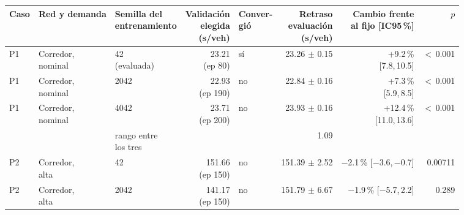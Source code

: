 \begin{table}[H]
\centering
\scriptsize
\setlength{\tabcolsep}{3pt}
\begin{tabular}{lllrlrrr}
\toprule
Caso & Red y demanda & \makecell{Semilla del\\entrenamiento} & \makecell{Validación\\elegida\\(s/veh)} & \makecell{Conver-\\gió} & \makecell{Retraso\\evaluación\\(s/veh)} & \makecell{Cambio frente\\al fijo [IC95\,\%]} & $p$ \\
\midrule
P1 & \makecell[l]{Corredor,\\{}nominal} & \makecell[l]{42\\{}(evaluada)} & \makecell[r]{23.21\\{}(ep 80)} & sí & \makecell[r]{23.26\\{}$\pm$ 0.15} & \makecell[r]{+9.2\,\%\\{}[7.8,\,10.5]} & $<$\,0.001 \\
P1 & \makecell[l]{Corredor,\\{}nominal} & 2042 & \makecell[r]{22.93\\{}(ep 190)} & no & \makecell[r]{22.84\\{}$\pm$ 0.16} & \makecell[r]{+7.3\,\%\\{}[5.9,\,8.5]} & $<$\,0.001 \\
P1 & \makecell[l]{Corredor,\\{}nominal} & 4042 & \makecell[r]{23.71\\{}(ep 200)} & no & \makecell[r]{23.93\\{}$\pm$ 0.16} & \makecell[r]{+12.4\,\%\\{}[11.0,\,13.6]} & $<$\,0.001 \\
 & & \makecell[l]{rango entre\\{}los tres} & & & 1.09 & & \\
P2 & \makecell[l]{Corredor,\\{}alta} & 42 & \makecell[r]{151.66\\{}(ep 150)} & no & \makecell[r]{151.39\\{}$\pm$ 2.52} & \makecell[r]{$-$2.1\,\%\\{}[$-$3.6,\,$-$0.7]} & 0.00711 \\
P2 & \makecell[l]{Corredor,\\{}alta} & 2042 & \makecell[r]{141.17\\{}(ep 150)} & no & \makecell[r]{151.79\\{}$\pm$ 6.67} & \makecell[r]{$-$1.9\,\%\\{}[$-$5.7,\,2.2]} & 0.289 \\

\end{tabular}
\end{table}
